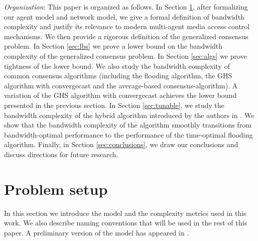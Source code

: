 \documentclass[letterpaper,10pt,conference]{ieeeconf}
\begin{document}
\emph{Organization}: This paper is organized as follows.
In Section \ref{sec:setup}, after formalizing our agent model and network model, we give a formal definition of bandwidth complexity and justify its relevance to modern multi-agent media access control mechanisms. We then provide a rigorous definition of the generalized consensus problem.
In Section \ref{sec:lbs} we prove a lower bound on the bandwidth complexity of the generalized consensus problem.
In Section \ref{sec:algs} we prove tightness of the lower bound. We also study the bandwidth complexity of common consensus algorithms (including the flooding algorithm, the GHS algorithm with convergecast and the average-based consensus-algorithm). A variation of the GHS algorithm with convergecast achieves the lower bound presented in the previous section.
In Section \ref{sec:tunable}, we study the bandwidth complexity of the hybrid algorithm introduced by the authors in \cite{FR-MP:13}. We  show that the  bandwidth complexity of the algorithm smoothly transitions from bandwidth-optimal performance to the performance of the time-optimal flooding algorithm.
Finally, in Section \ref{sec:conclusions}, we draw our conclusions and discuss directions for future research.

\section{Problem setup}
\label{sec:setup}
In this section we introduce the model and the complexity metrics used in this work. We also describe naming conventions that will be used in the rest of this paper. A preliminary version of the model has appeared in \cite{FR-MP:13}.
\end{document}
